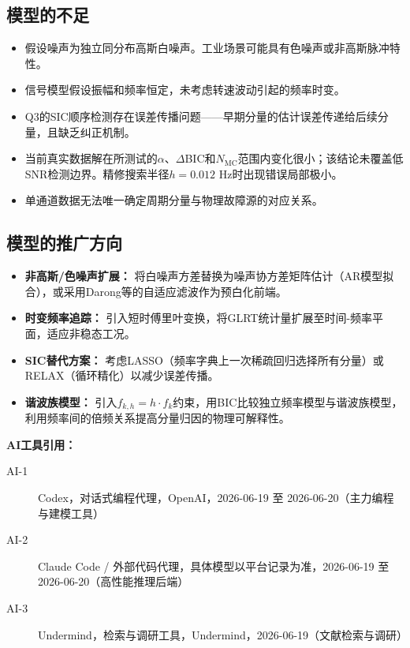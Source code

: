 \documentclass[withoutpreface,bwprint]{cumcmthesis}
\begin{document}
\subsection{模型的不足}
\begin{itemize}
    \item [(1)] 假设噪声为独立同分布高斯白噪声。工业场景可能具有色噪声或非高斯脉冲特性。
    \item [(2)] 信号模型假设振幅和频率恒定，未考虑转速波动引起的频率时变。
    \item [(3)] Q3的SIC顺序检测存在误差传播问题——早期分量的估计误差传递给后续分量，且缺乏纠正机制。
    \item [(4)] 当前真实数据解在所测试的$\alpha$、$\Delta$BIC和$N_{\text{MC}}$范围内变化很小；该结论未覆盖低SNR检测边界。精修搜索半径$h=0.012$ Hz时出现错误局部极小。
    \item [(5)] 单通道数据无法唯一确定周期分量与物理故障源的对应关系。
\end{itemize}

\subsection{模型的推广方向}
\begin{itemize}
    \item [(1)] \textbf{非高斯/色噪声扩展：} 将白噪声方差替换为噪声协方差矩阵估计（AR模型拟合），或采用Darong等的自适应滤波作为预白化前端。
    \item [(2)] \textbf{时变频率追踪：} 引入短时傅里叶变换，将GLRT统计量扩展至时间-频率平面，适应非稳态工况。
    \item [(3)] \textbf{SIC替代方案：} 考虑LASSO（频率字典上一次稀疏回归选择所有分量）或RELAX（循环精化）以减少误差传播。
    \item [(4)] \textbf{谐波族模型：} 引入$f_{k,h}=h\cdot f_k$约束，用BIC比较独立频率模型与谐波族模型，利用频率间的倍频关系提高分量归因的物理可解释性。
\end{itemize}




\vspace{1em}
\noindent\textbf{AI工具引用：}
\begin{description}
    \item[AI-1] Codex，对话式编程代理，OpenAI，2026-06-19 至 2026-06-20（主力编程与建模工具）
    \item[AI-2] Claude Code / 外部代码代理，具体模型以平台记录为准，2026-06-19 至 2026-06-20（高性能推理后端）
    \item[AI-3] Undermind，检索与调研工具，Undermind，2026-06-19（文献检索与调研）
\end{description}
\end{document}
